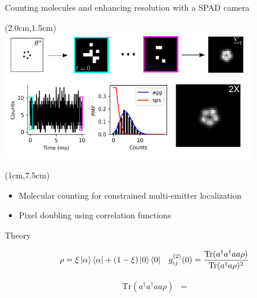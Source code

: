 \documentclass{beamer}					%
\begin{document}
\begin{frame}{Counting molecules and enhancing resolution with a SPAD camera}

\begin{textblock*}{11cm}(2.0cm,1.5cm)
\includegraphics[width=11cm]{DoubleFigure.png}
\end{textblock*}

\begin{textblock*}{11cm}(1cm,7.5cm)
\begin{itemize}
\item Molecular counting for constrained multi-emitter localization
\item Pixel doubling using correlation functions
\end{itemize}

\end{textblock*}

\end{frame}

\begin{frame}{Theory}

\begin{equation*}
\rho = \xi\ket{\alpha}\bra{\alpha} + (1-\xi)\ket{0}\bra{0}\;\;\; g^{(2)}_{ij}(0) = \frac{\mathrm{Tr}(a^{\dagger}a^{\dagger}aa\rho)}{\mathrm{Tr}(a^{\dagger}a\rho)^{2}}
\end{equation*}

\begin{align*}
\mathrm{Tr}(a^{\dagger}a^{\dagger}aa\rho) &= 
\end{align*}

\end{frame}
\end{document}
